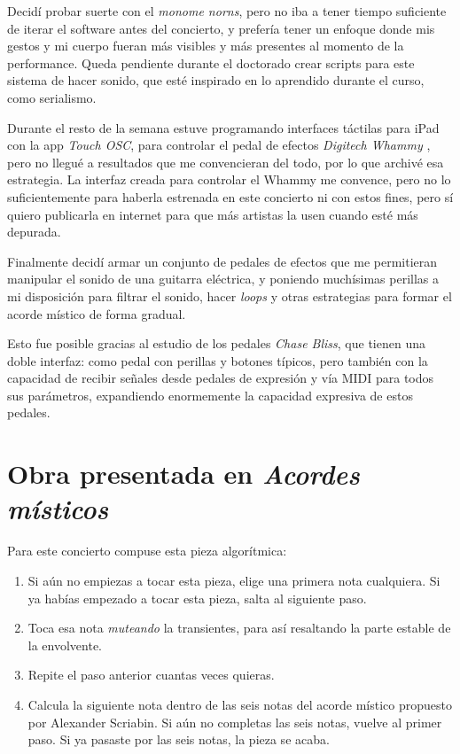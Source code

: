 \documentclass{article}
\begin{document}
Decidí probar suerte con el \textit{monome norns}, pero no iba a tener tiempo suficiente de iterar el software antes del concierto, y prefería tener un enfoque donde mis gestos y mi cuerpo fueran más visibles y más presentes al momento de la performance. Queda pendiente durante el doctorado crear scripts para este sistema de hacer sonido, que esté inspirado en lo aprendido durante el curso, como serialismo.

Durante el resto de la semana estuve programando interfaces táctilas para iPad con la app \textit{Touch OSC}, para controlar el pedal de efectos \textit{Digitech Whammy} \cite{digitechWhammy}, pero no llegué a resultados que me convencieran del todo, por lo que archivé esa estrategia. La interfaz creada para controlar el Whammy me convence, pero no lo suficientemente para haberla estrenada en este concierto ni con estos fines, pero sí quiero publicarla en internet para que más artistas la usen cuando esté más depurada.

Finalmente decidí armar un conjunto de pedales de efectos que me permitieran manipular el sonido de una guitarra eléctrica, y poniendo muchísimas perillas a mi disposición para filtrar el sonido, hacer \textit{loops} y otras estrategias para formar el acorde místico de forma gradual.

Esto fue posible gracias al estudio de los pedales \textit{Chase Bliss}, que tienen una doble interfaz: como pedal con perillas y botones típicos, pero también con la capacidad de recibir señales desde pedales de expresión y vía MIDI para todos sus parámetros, expandiendo enormemente la capacidad expresiva de estos pedales.

\clearpage

\section{Obra presentada en \textit{Acordes místicos}}

Para este concierto compuse esta pieza algorítmica:

\begin{enumerate}
    \item Si aún no empiezas a tocar esta pieza, elige una primera nota cualquiera. Si ya habías empezado a tocar esta pieza, salta al siguiente paso.
    \item Toca esa nota \textit{muteando} la transientes, para así resaltando la parte estable de la envolvente.
    \item Repite el paso anterior cuantas veces quieras.
    \item Calcula la siguiente nota dentro de las seis notas del acorde místico propuesto por Alexander Scriabin. Si aún no completas las seis notas, vuelve al primer paso. Si ya pasaste por las seis notas, la pieza se acaba.
\end{enumerate}
\end{document}
